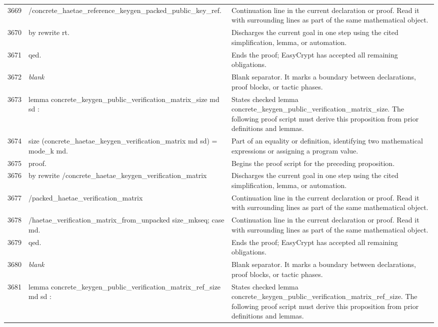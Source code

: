 \documentclass[10pt]{article}
\begin{document}
\begin{longtable}{r L{0.53\textwidth} L{0.37\textwidth}}
3669 & {\ttfamily\scriptsize         /concrete\_haetae\_reference\_keygen\_packed\_public\_key\_ref.} & Continuation line in the current declaration or proof.  Read it with surrounding lines as part of the same mathematical object. \\
3670 & {\ttfamily\scriptsize by rewrite rt.} & Discharges the current goal in one step using the cited simplification, lemma, or automation. \\
3671 & {\ttfamily\scriptsize qed.} & Ends the proof; EasyCrypt has accepted all remaining obligations. \\
3672 & {\ttfamily\scriptsize \emph{blank}} & Blank separator.  It marks a boundary between declarations, proof blocks, or tactic phases. \\
3673 & {\ttfamily\scriptsize lemma concrete\_keygen\_public\_verification\_matrix\_size md sd :} & States checked lemma concrete\_keygen\_public\_verification\_matrix\_size.  The following proof script must derive this proposition from prior definitions and lemmas. \\
3674 & {\ttfamily\scriptsize   size (concrete\_haetae\_keygen\_verification\_matrix md sd) = mode\_k md.} & Part of an equality or definition, identifying two mathematical expressions or assigning a program value. \\
3675 & {\ttfamily\scriptsize proof.} & Begins the proof script for the preceding proposition. \\
3676 & {\ttfamily\scriptsize by rewrite /concrete\_haetae\_keygen\_verification\_matrix} & Discharges the current goal in one step using the cited simplification, lemma, or automation. \\
3677 & {\ttfamily\scriptsize            /packed\_haetae\_verification\_matrix} & Continuation line in the current declaration or proof.  Read it with surrounding lines as part of the same mathematical object. \\
3678 & {\ttfamily\scriptsize            /haetae\_verification\_matrix\_from\_unpacked size\_mkseq; case md.} & Continuation line in the current declaration or proof.  Read it with surrounding lines as part of the same mathematical object. \\
3679 & {\ttfamily\scriptsize qed.} & Ends the proof; EasyCrypt has accepted all remaining obligations. \\
3680 & {\ttfamily\scriptsize \emph{blank}} & Blank separator.  It marks a boundary between declarations, proof blocks, or tactic phases. \\
3681 & {\ttfamily\scriptsize lemma concrete\_keygen\_public\_verification\_matrix\_ref\_size md sd :} & States checked lemma concrete\_keygen\_public\_verification\_matrix\_ref\_size.  The following proof script must derive this proposition from prior definitions and lemmas. \\

\end{longtable}
\end{document}
